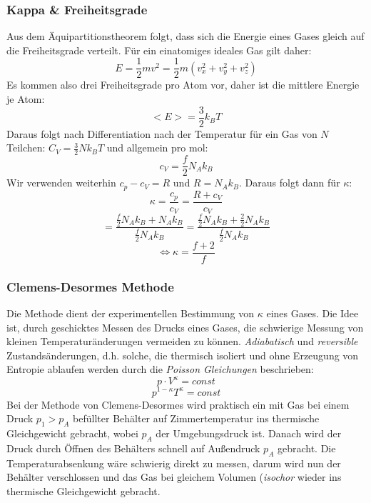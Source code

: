 \documentclass[%
   final,      %
   paper=a4, paper=portrait, pagesize=auto, %
   fontsize=11pt, %
   ngerman, %
 ]{scrartcl} %
\begin{document}
\subsubsection{Kappa \& Freiheitsgrade}
Aus dem Äquipartitionstheorem folgt, dass sich die Energie eines Gases gleich auf die Freiheitsgrade verteilt. Für ein einatomiges ideales Gas gilt daher:
\begin{equation}\nonumber
E = \frac{1}{2}mv^2 = \frac{1}{2}m(v_x^2 + v_y^2 + v_z^2)
\end{equation}
Es kommen also drei Freiheitsgrade pro Atom vor, daher ist die mittlere Energie je Atom:
\begin{equation}\nonumber
<E> = \frac{3}{2}k_BT
\end{equation}
Daraus folgt nach Differentiation nach der Temperatur für ein Gas von $N$ Teilchen: $C_V = \frac{3}{2}Nk_BT$ und allgemein pro mol:
\begin{equation}
c_V = \frac{f}{2}N_Ak_B
\end{equation}
Wir verwenden weiterhin $c_p - c_V = R$ und $R = N_Ak_B$. Daraus folgt dann für $\kappa$:
\[\kappa = \frac{c_p}{c_V} = \frac{R + c_V}{c_V}\]
\[ = \frac{\frac{f}{2}N_Ak_B + N_Ak_B}{\frac{f}{2}N_Ak_B} = \frac{\frac{f}{2}N_Ak_B + \frac{2}{2}N_Ak_B}{\frac{f}{2}N_Ak_B}\]
\begin{equation}
\Longleftrightarrow \kappa = \frac{f+2}{f}
\end{equation}
\subsubsection{Clemens-Desormes Methode}
Die Methode dient der experimentellen Bestimmung von $\kappa$ eines Gases.
Die Idee ist, durch geschicktes Messen des Drucks eines Gases, die schwierige Messung von kleinen Temperaturänderungen vermeiden zu können.
\emph{Adiabatisch} und \emph{reversible} Zustandsänderungen, d.h. solche, die thermisch isoliert und ohne Erzeugung von Entropie ablaufen werden durch die \emph{Poisson Gleichungen} beschrieben:
\begin{equation}
p\cdot V^\kappa = const
\end{equation}
\begin{equation}
p^{1-\kappa} T^\kappa = const
\end{equation}
Bei der Methode von Clemens-Desormes wird praktisch ein mit Gas bei einem Druck $p_1 > p_A$ befüllter Behälter auf Zimmertemperatur ins thermische Gleichgewicht gebracht, wobei $p_A$ der Umgebungsdruck ist. Danach wird der Druck durch Öffnen des Behälters schnell auf Außendruck $p_A$ gebracht. Die Temperaturabsenkung wäre schwierig direkt zu messen, darum wird nun der Behälter verschlossen und das Gas bei gleichem Volumen (\emph{isochor} wieder ins thermische Gleichgewicht gebracht.
\end{document}
